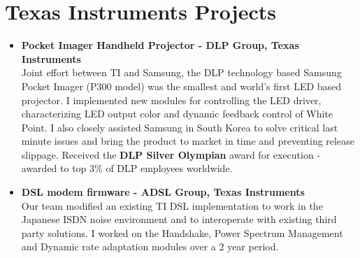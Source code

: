 \documentclass[line, 11pt]{res}
\renewenvironment{resume}{\begingroup}{\endgroup}
\begin{document}
\begin{resume}
\section{Texas Instruments Projects}
    \begin{itemize}
        \item \textbf{Pocket Imager Handheld Projector - DLP Group, Texas Instruments}\\
        Joint effort between TI and Samsung, the DLP technology based Samsung
        Pocket Imager (P300 model) was the smallest and world's first LED
        based projector. I implemented new modules for controlling the LED
        driver, characterizing LED output color and dynamic feedback control
        of White Point. I also closely assisted Samsung in South Korea to solve
        critical last minute issues and bring the product to market in time
        and preventing release slippage. Received the \textbf{DLP Silver
        Olympian} award for execution - awarded to top 3\% of DLP employees worldwide.


        \item \textbf{DSL modem firmware - ADSL Group, Texas Instruments}\\
        Our team modified an existing TI DSL implementation to work in the
        Japanese ISDN noise environment and to interoperate with existing third
        party solutions. I worked on the Handshake, Power Spectrum Management
        and Dynamic rate adaptation modules over a 2 year period.
    \end{itemize}




\end{resume}
\end{document}
